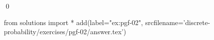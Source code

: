 
\begin{ex} 
  \label{ex:pgf-02}
  
  \qed
\end{ex} 
\begin{python0}
from solutions import *
add(label="ex:pgf-02",
    srcfilename='discrete-probability/exercises/pgf-02/answer.tex') 
\end{python0}
